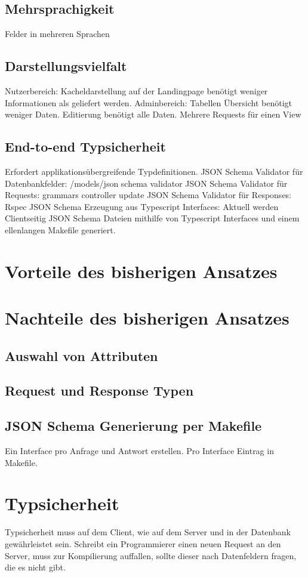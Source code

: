 \subsection{Mehrsprachigkeit}
Felder in mehreren Sprachen

\subsection{Darstellungsvielfalt}
Nutzerbereich:
Kacheldarstellung auf der Landingpage benötigt weniger Informationen als geliefert werden.
Adminbereich:
Tabellen Übersicht benötigt weniger Daten. Editierung benötigt alle Daten.
Mehrere Requests für einen View

\subsection{End-to-end Typsicherheit}
Erfordert applikationsübergreifende Typdefinitionen.
JSON Schema Validator für Datenbankfelder:
/models/json schema validator
JSON Schema Validator für Requests:
grammars controller update
JSON Schema Validator für Responses:
Rspec
JSON Schema Erzeugung aus Typescript Interfaces:
Aktuell werden Clientseitig JSON Schema Dateien mithilfe von Typescript Interfaces und einem ellenlangen Makefile generiert.

\section{Vorteile des bisherigen Ansatzes}
\section{Nachteile des bisherigen Ansatzes}
\subsection{Auswahl von Attributen}
\subsection{Request und Response Typen}
\subsection{JSON Schema Generierung per Makefile}
Ein Interface pro Anfrage und Antwort erstellen. Pro Interface Eintrag in Makefile.

\section{Typsicherheit}
Typsicherheit muss auf dem Client, wie auf dem Server und in der Datenbank gewährleistet sein. Schreibt ein Programmierer einen neuen Request an den Server,
muss zur Kompilierung auffallen, sollte dieser nach Datenfeldern fragen, die es nicht gibt.

